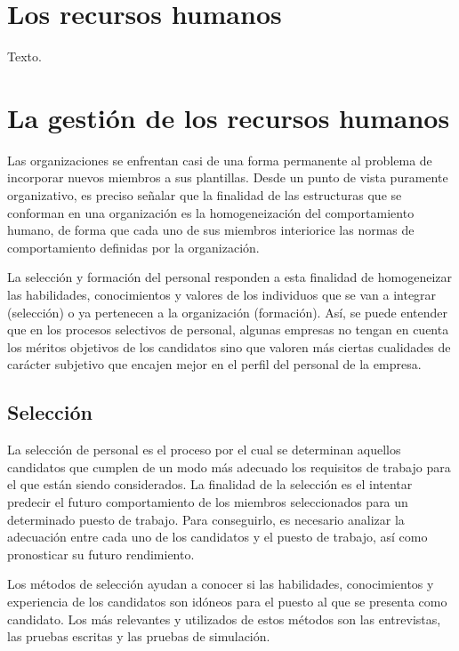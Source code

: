 \documentclass[
]{krantz}
\begin{document}
\hypertarget{los-recursos-humanos}{%
\section{Los recursos humanos}\label{los-recursos-humanos}}

Texto.

\hypertarget{la-gestiuxf3n-de-los-recursos-humanos}{%
\section{La gestión de los recursos humanos}\label{la-gestiuxf3n-de-los-recursos-humanos}}

Las organizaciones se enfrentan casi de una forma permanente al problema de incorporar nuevos miembros a sus plantillas. Desde un punto de vista puramente organizativo, es preciso señalar que la finalidad de las estructuras que se conforman en una organización es la homogeneización del comportamiento humano, de forma que cada uno de sus miembros interiorice las normas de comportamiento definidas por la organización.

La selección y formación del personal responden a esta finalidad de homogeneizar las habilidades, conocimientos y valores de los individuos que se van a integrar (selección) o ya pertenecen a la organización (formación). Así, se puede entender que en los procesos selectivos de personal, algunas empresas no tengan en cuenta los méritos objetivos de los candidatos sino que valoren más ciertas cualidades de carácter subjetivo que encajen mejor en el perfil del personal de la empresa.

\hypertarget{selecciuxf3n}{%
\subsection{Selección}\label{selecciuxf3n}}

La selección de personal es el proceso por el cual se determinan aquellos candidatos que cumplen de un modo más adecuado los requisitos de trabajo para el que están siendo considerados. La finalidad de la selección es el intentar predecir el futuro comportamiento de los miembros seleccionados para un determinado puesto de trabajo. Para conseguirlo, es necesario analizar la adecuación entre cada uno de los candidatos y el puesto de trabajo, así como pronosticar su futuro rendimiento.

Los métodos de selección ayudan a conocer si las habilidades, conocimientos y experiencia de los candidatos son idóneos para el puesto al que se presenta como candidato. Los más relevantes y utilizados de estos métodos son las entrevistas, las pruebas escritas y las pruebas de simulación.
\end{document}

